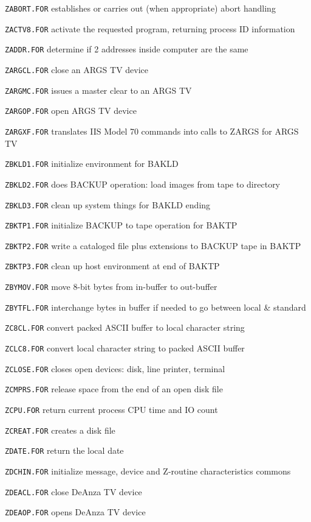 {\item{\tt ZABORT.FOR} establishes or carries out (when appropriate) abort handling
\item{\tt ZACTV8.FOR} activate the requested program, returning process ID information
\item{\tt ZADDR.FOR} determine if 2 addresses inside computer are the same
\item{\tt ZARGCL.FOR} close an ARGS TV device
\item{\tt ZARGMC.FOR} issues a master clear to an ARGS TV
\item{\tt ZARGOP.FOR} open ARGS TV device
\item{\tt ZARGXF.FOR} translates IIS Model 70 commands into calls to ZARGS for ARGS TV
\item{\tt ZBKLD1.FOR} initialize environment for BAKLD
\item{\tt ZBKLD2.FOR} does BACKUP operation: load images from tape to directory
\item{\tt ZBKLD3.FOR} clean up system things for BAKLD ending
\item{\tt ZBKTP1.FOR} initialize BACKUP to tape operation for BAKTP
\item{\tt ZBKTP2.FOR} write a cataloged file plus extensions to BACKUP tape in BAKTP
\item{\tt ZBKTP3.FOR} clean up host environment at end of BAKTP
\item{\tt ZBYMOV.FOR} move 8-bit bytes from in-buffer to out-buffer
\item{\tt ZBYTFL.FOR} interchange bytes in buffer if needed to go between local \& standard
\item{\tt ZC8CL.FOR} convert packed ASCII buffer to local character string
\item{\tt ZCLC8.FOR} convert local character string to packed ASCII buffer
\item{\tt ZCLOSE.FOR} closes open devices: disk, line printer, terminal
\item{\tt ZCMPRS.FOR} release space from the end of an open disk file
\item{\tt ZCPU.FOR} return current process CPU time and IO count
\item{\tt ZCREAT.FOR} creates a disk file
\item{\tt ZDATE.FOR} return the local date
\item{\tt ZDCHIN.FOR} initialize message, device and Z-routine characteristics commons
\item{\tt ZDEACL.FOR} close DeAnza TV device
\item{\tt ZDEAOP.FOR} opens DeAnza TV device
}
